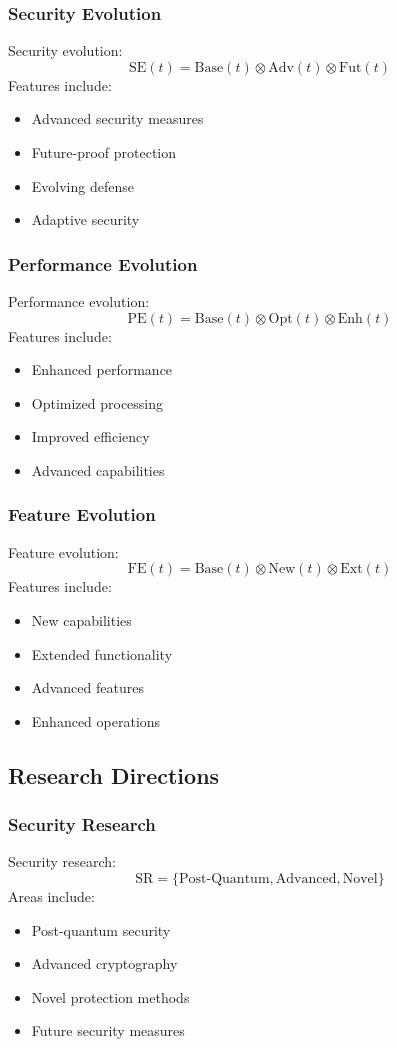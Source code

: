 \documentclass[12pt]{article}
\begin{document}
\subsubsection{Security Evolution}
Security evolution:
\begin{equation}
\text{SE}(t) = \text{Base}(t) \otimes \text{Adv}(t) \otimes \text{Fut}(t)
\end{equation}
Features include:
\begin{itemize}
\item Advanced security measures
\item Future-proof protection
\item Evolving defense
\item Adaptive security
\end{itemize}
\subsubsection{Performance Evolution}
Performance evolution:
\begin{equation}
\text{PE}(t) = \text{Base}(t) \otimes \text{Opt}(t) \otimes \text{Enh}(t)
\end{equation}
Features include:
\begin{itemize}
\item Enhanced performance
\item Optimized processing
\item Improved efficiency
\item Advanced capabilities
\end{itemize}
\subsubsection{Feature Evolution}
Feature evolution:
\begin{equation}
\text{FE}(t) = \text{Base}(t) \otimes \text{New}(t) \otimes \text{Ext}(t)
\end{equation}
Features include:
\begin{itemize}
\item New capabilities
\item Extended functionality
\item Advanced features
\item Enhanced operations
\end{itemize}
\subsection{Research Directions}
\subsubsection{Security Research}
Security research:
\begin{equation}
\text{SR} = \{\text{Post-Quantum}, \text{Advanced}, \text{Novel}\}
\end{equation}
Areas include:
\begin{itemize}
\item Post-quantum security
\item Advanced cryptography
\item Novel protection methods
\item Future security measures
\end{itemize}
\end{document}
